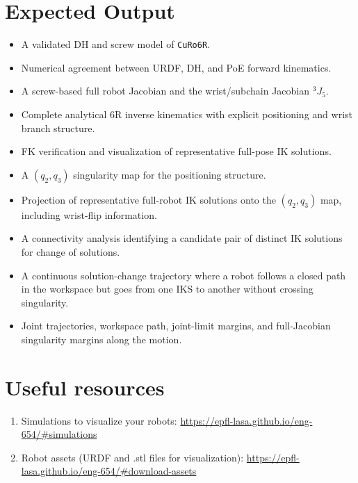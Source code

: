\documentclass[11pt,a4paper]{article}
\begin{document}
\section*{Expected Output}
\begin{itemize}
  \item A validated DH and screw model of \texttt{CuRo6R}.
  \item Numerical agreement between URDF, DH, and PoE forward kinematics.
  \item A screw-based full robot Jacobian and the wrist/subchain Jacobian $^{3}J_{5}$.
  \item Complete analytical 6R inverse kinematics with explicit positioning and wrist branch structure.
  \item FK verification and visualization of representative full-pose IK solutions.
  \item A $(q_2,q_3)$ singularity map for the positioning structure.
  \item Projection of representative full-robot IK solutions onto the $(q_2,q_3)$ map, including wrist-flip information.
  \item A connectivity analysis identifying a candidate pair of distinct IK solutions for change of solutions.
  \item A continuous solution-change trajectory where a robot follows a closed path in the workspace but goes from one IKS to another without crossing singularity.
  \item Joint trajectories, workspace path, joint-limit margins, and full-Jacobian singularity margins along the motion.
\end{itemize}

\section*{Useful resources}
\begin{enumerate}
	\item Simulations to visualize your robots: \url{https://epfl-lasa.github.io/eng-654/#simulations} 
	\item Robot assets (URDF and .stl files for visualization): \url{https://epfl-lasa.github.io/eng-654/#download-assets}
\end{enumerate}
\end{document}
